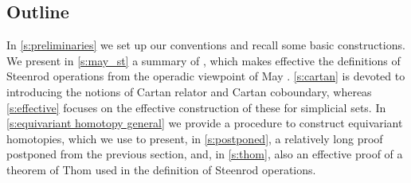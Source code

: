 
\subsection*{Outline}

In \cref{s:preliminaries} we set up our conventions and recall some basic constructions.
We present in \cref{s:may_st} a summary of \cite{medina2021may_st}, which makes effective the definitions of Steenrod operations \cite{steenrod1953cyclic} from the operadic viewpoint of May \cite{may1970general}.
\cref{s:cartan} is devoted to introducing the notions of Cartan relator and Cartan coboundary, whereas \cref{s:effective} focuses on the effective construction of these for simplicial sets.
In \cref{s:equivariant homotopy general} we provide a procedure to construct equivariant homotopies, which we use to present, in \cref{s:postponed}, a relatively long proof postponed from the previous section, and, in \cref{s:thom}, also an effective proof of a theorem of Thom used in the definition of Steenrod operations.